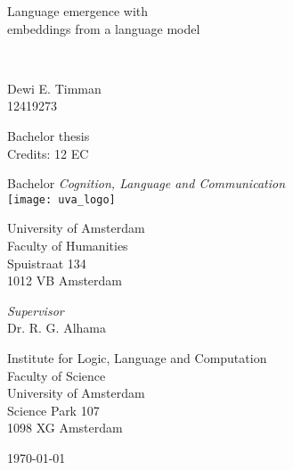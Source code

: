 \documentclass[a4paper, 12pt]{report}
\newcommand{\theTitle}{Language emergence with \\
\vspace{0.5em}
embeddings from a language model}
\newcommand{\theSubTitle}{}%
\newcommand{\theAuthor}{Dewi E. Timman}
\newcommand{\theStudentID}{12419273}
\newcommand{\theSupervisor}{Dr. R. G. Alhama} %
\newcommand{\theInstitute}{
Institute for Logic, Language and Computation \\ %
Faculty of Science\\
University of Amsterdam\\
Science Park 107 \\ 
1098 XG Amsterdam 
}
\newcommand{\theDate}{\today}
\begin{document}
\renewcommand{\APACrefYearMonthDay}[3]{\APACrefYear{#1}}
\pagestyle{empty}
\begin{center}

\vspace{2.5cm}


\begin{Huge}
\theTitle
\end{Huge} \\

\vspace{0.5 cm}

\begin{Large}
\theSubTitle
\end{Large}

\vspace{1.5cm}

\theAuthor\\
\theStudentID

\vspace{1.5cm}

Bachelor thesis\\
Credits: 12 EC

\vspace{0.5cm}

Bachelor \textit{Cognition, Language and Communication} \\
\vspace{0.25cm}
\texttt{[image: uva\_logo]} \\
\vspace{0.1cm}

University of Amsterdam\\
Faculty of Humanities\\
Spuistraat 134\\
1012 VB Amsterdam

\vspace{2cm}

\emph{Supervisor}\\

\theSupervisor

\vspace{0.25cm}

\theInstitute

\vspace{1.0cm}

\theDate

\end{center}
\newpage
\end{document}
